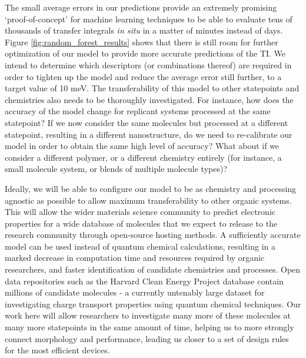 \documentclass[12pt]{article}
\begin{document}
The small average errors in our predictions provide an extremely promising `proof-of-concept' for machine learning techniques to be able to evaluate tens of thousands of transfer integrals \textit{in situ} in a matter of minutes instead of days.
Figure \ref{fig:random_forest_results} shows that there is still room for further optimization of our model to provide more accurate predictions of the TI.
We intend to determine which descriptors (or combinations thereof) are required in order to tighten up the model and reduce the average error still further, to a target value of 10 meV.
The transferability of this model to other statepoints and chemistries also needs to be thoroughly investigated.
For instance, how does the accuracy of the model change for replicant systems processed at the same statepoint?
If we now consider the same molecules but processed at a different statepoint, resulting in a different nanostructure, do we need to re-calibrate our model in order to obtain the same high level of accuracy?
What about if we consider a different polymer, or a different chemistry entirely (for instance, a small molecule system, or blends of multiple molecule types)?


Ideally, we will be able to configure our model to be as chemistry and processing agnostic as possible to allow maximum transferability to other organic systems.
This will allow the wider materials science community to predict electronic properties for a wide database of molecules that we expect to release to the research community through open-source hosting methods.
A sufficiently accurate model can be used instead of quantum chemical calculations, resulting in a marked decrease in computation time and resources required by organic researchers, and faster identification of candidate chemistries and processes.
Open data repositories such as the Harvard Clean Energy Project database contain millions of candidate molecules - a currently untenably large dataset for investigating charge transport properties using quantum chemical techniques.
Our work here will allow researchers to investigate many more of these molecules at many more statepoints in the same amount of time, helping us to more strongly connect morphology and performance, leading us closer to a set of design rules for the most efficient devices.
\end{document}
